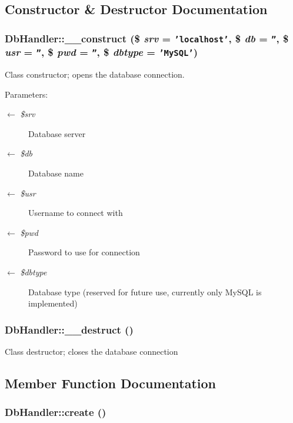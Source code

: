 \subsection{Constructor \& Destructor Documentation}
\hypertarget{classDbHandler_e54e9d4643f41a9296167086f6a769fc}{
\subsubsection{\setlength{\rightskip}{0pt plus 5cm}DbHandler::\_\-\_\-construct (\$ {\em srv} = {\tt 'localhost'}, \$ {\em db} = {\tt ''}, \$ {\em usr} = {\tt ''}, \$ {\em pwd} = {\tt ''}, \$ {\em dbtype} = {\tt 'MySQL'})}}
\label{classDbHandler_e54e9d4643f41a9296167086f6a769fc}


Class constructor; opens the database connection.

\begin{Desc}
\item[Parameters:]
\begin{description}
\item[\mbox{$\leftarrow$} {\em \$srv}]Database server \item[\mbox{$\leftarrow$} {\em \$db}]Database name \item[\mbox{$\leftarrow$} {\em \$usr}]Username to connect with \item[\mbox{$\leftarrow$} {\em \$pwd}]Password to use for connection \item[\mbox{$\leftarrow$} {\em \$dbtype}]Database type (reserved for future use, currently only MySQL is implemented) \end{description}
\end{Desc}
\hypertarget{classDbHandler_7cd6bd727d1f296eb5dbfae6ca36ab3f}{
\subsubsection{\setlength{\rightskip}{0pt plus 5cm}DbHandler::\_\-\_\-destruct ()}}
\label{classDbHandler_7cd6bd727d1f296eb5dbfae6ca36ab3f}


Class destructor; closes the database connection 

\subsection{Member Function Documentation}
\hypertarget{classDbHandler_c9e93cb0ab57f03b2719eebd0c0ee2ef}{
\subsubsection{\setlength{\rightskip}{0pt plus 5cm}DbHandler::create ()}}
\label{classDbHandler_c9e93cb0ab57f03b2719eebd0c0ee2ef}


